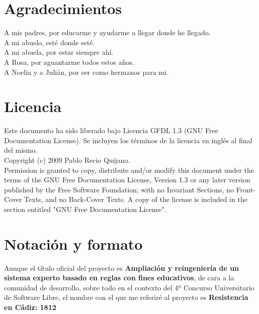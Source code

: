 

\section*{Agradecimientos}

A mis padres, por educarme y ayudarme a llegar donde he llegado.\\
A mi abuelo, esté donde esté.\\
A mi abuela, por estar siempre ahí.\\
A Rosa, por aguantarme todos estos años.\\
A Noelia y a Julián, por ser como hermanos para mi.

\cleardoublepage

\section*{Licencia} %

Este documento ha sido liberado bajo Licencia GFDL 1.3 (GNU Free
Documentation License). Se incluyen los términos de la licencia en
inglés al final del mismo.\\

Copyright (c) 2009 Pablo Recio Quijano.\\

Permission is granted to copy, distribute and/or modify this document under the
terms of the GNU Free Documentation License, Version 1.3 or any later version
published by the Free Software Foundation; with no Invariant Sections, no
Front-Cover Texts, and no Back-Cover Texts. A copy of the license is included in
the section entitled "GNU Free Documentation License".\\

\cleardoublepage

\section*{Notación y formato}

Aunque el título oficial del proyecto es \textbf{Ampliación y reingeniería de 
un sistema experto basado en reglas con fines educativos}, de cara a la 
comunidad de desarrollo, sobre todo en el contexto del 4º Concurso Universitario
de Software Libre, el nombre con el que me referiré al proyecto es \textbf{
Resistencia en Cádiz: 1812}